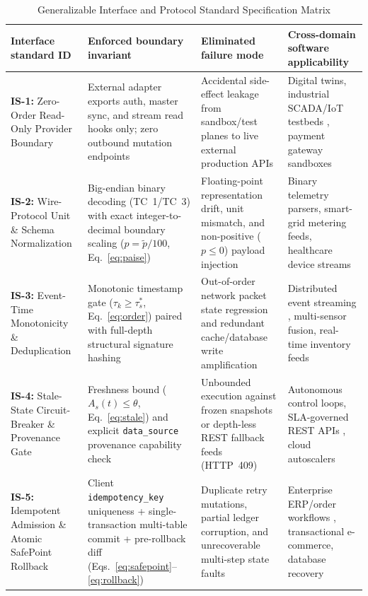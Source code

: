 \documentclass[journal,onecolumn,10pt]{IEEEtran}
\begin{document}
\begin{table}[!t]
\caption{Generalizable Interface and Protocol Standard Specification Matrix}
\label{tab:standards}
\centering
\small
\renewcommand{\arraystretch}{1.12}
\begin{tabularx}{\textwidth}{@{}>{\raggedright\arraybackslash}p{1.45in}>{\raggedright\arraybackslash}p{1.55in}>{\raggedright\arraybackslash}p{1.45in}X@{}}
\toprule
Interface standard ID & Enforced boundary invariant & Eliminated failure mode & Cross-domain software applicability \\
\midrule
\textbf{IS-1:} Zero-Order Read-Only Provider Boundary & External adapter exports auth, master sync, and stream read hooks only; zero outbound mutation endpoints & Accidental side-effect leakage from sandbox/test planes to live external production APIs & Digital twins, industrial SCADA/IoT testbeds \cite{rath2023}, payment gateway sandboxes \\
\textbf{IS-2:} Wire-Protocol Unit \& Schema Normalization & Big-endian binary decoding (TC~1/TC~3) with exact integer-to-decimal boundary scaling ($p=\tilde{p}/100$, Eq.~\eqref{eq:paise}) & Floating-point representation drift, unit mismatch, and non-positive ($p\le 0$) payload injection & Binary telemetry parsers, smart-grid metering feeds, healthcare device streams \\
\textbf{IS-3:} Event-Time Monotonicity \& Deduplication & Monotonic timestamp gate ($\tau_k \ge \tau^*_s$, Eq.~\eqref{eq:order}) paired with full-depth structural signature hashing & Out-of-order network packet state regression and redundant cache/database write amplification & Distributed event streaming \cite{akidau2015}, multi-sensor fusion, real-time inventory feeds \\
\textbf{IS-4:} Stale-State Circuit-Breaker \& Provenance Gate & Freshness bound ($A_s(t)\le\theta$, Eq.~\eqref{eq:stale}) and explicit \texttt{data\_source} provenance capability check & Unbounded execution against frozen snapshots or depth-less REST fallback feeds (HTTP~409) & Autonomous control loops, SLA-governed REST APIs \cite{fresnoaranda2024}, cloud autoscalers \\
\textbf{IS-5:} Idempotent Admission \& Atomic SafePoint Rollback & Client \texttt{idempotency\_key} uniqueness + single-transaction multi-table commit + pre-rollback diff (Eqs.~\eqref{eq:safepoint}--\eqref{eq:rollback}) & Duplicate retry mutations, partial ledger corruption, and unrecoverable multi-step state faults & Enterprise ERP/order workflows \cite{helland2012}, transactional e-commerce, database recovery \\
\bottomrule
\end{tabularx}
\end{table}
\end{document}
